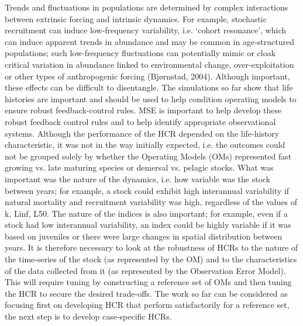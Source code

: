 
Trends and fluctuations in populations are determined by complex interactions between extrinsic forcing and intrinsic dynamics. For example, stochastic recruitment can induce low‐frequency variability, i.e. ‘cohort resonance’, which can induce apparent trends in abundance and may be common in age‐structured populations; such low‐frequency fluctuations can potentially mimic or cloak critical variation in abundance linked to environmental change, over‐exploitation or other types of anthropogenic forcing (Bjørnstad, 2004). Although important, these effects can be difficult to disentangle. The simulations so far show that life histories are important and should be used to help condition operating models to ensure robust feedback-control rules. MSE is important to help develop these robust feedback control rules and to help identify appropriate observational systems.
Although the performance of the HCR depended on the life-history characteristic, it was not in the way initially expected, i.e. the outcomes could not be grouped solely by whether the Operating Models (OMs) represented fast growing vs. late maturing species or demersal vs. pelagic stocks. What was important was the nature of the dynamics, i.e. how variable was the stock between years; for example, a stock could exhibit high interannual variability if natural mortality and recruitment variability was high, regardless of the values of k, Linf, L50. The nature of the indices is also important; for example, even if a stock had low interannual variability, an index could be highly variable if it was based on juveniles or there were large changes in spatial distribution between years. It is therefore necessary to look at the robustness of HCRs to the nature of the time-series of the stock (as represented by the OM) and to the characteristics of the data collected from it (as represented by the Observation Error Model). This will require tuning by constructing a reference set of OMs and then tuning the HCR to secure the desired trade-offs. The work so far can be considered as focusing first on developing HCR that perform satisfactorily for a reference set, the next step is to develop case-specific HCRs.


